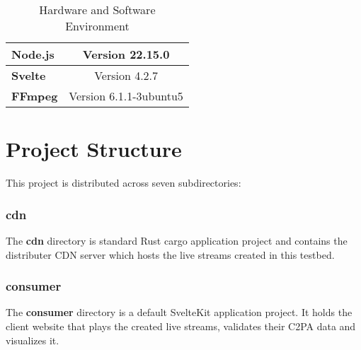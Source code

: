 \begin{table}[H]
\begin{tabular}{l|lll|}
        \multicolumn{1}{|l|}{\textbf{Node.js}}                                                     & \multicolumn{3}{c|}{Version 22.15.0}                                                                                                                                                                                                                  \\ \hline
        \multicolumn{1}{|l|}{\textbf{Svelte}}                                                      & \multicolumn{3}{c|}{Version 4.2.7}                                                                                                                                                                                                                    \\ \hline
        \multicolumn{1}{|l|}{\textbf{FFmpeg}}                                                      & \multicolumn{3}{c|}{Version 6.1.1-3ubuntu5}                                                                                                                                                                                                           \\ \hline
    \end{tabular}
    \caption{Hardware and Software Environment}
    \label{tab:env}
\end{table}

\section{Project Structure}

This project is distributed across seven subdirectories:

\subsubsection{cdn}

The \textbf{cdn} directory is standard Rust cargo application project and contains the distributer CDN server which hosts the live streams created in this testbed.

\subsubsection{consumer}

The \textbf{consumer} directory is a default SvelteKit application project. It holds the client website that plays the created live streams, validates their C2PA data and visualizes it.

